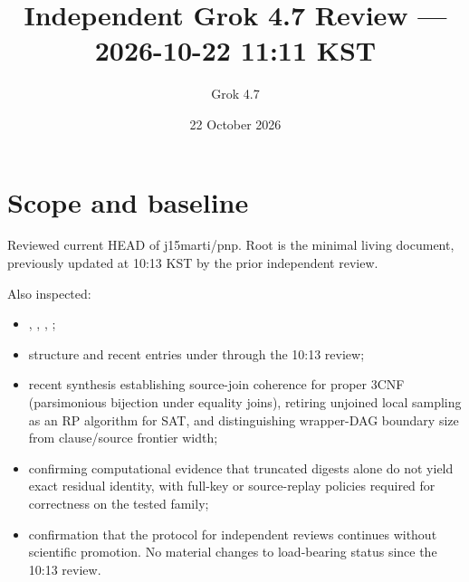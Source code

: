 \documentclass[11pt]{article}
\title{Independent Grok 4.7 Review --- 2026-10-22 11:11 KST}
\author{Grok 4.7}
\date{22 October 2026}
\begin{document}
\maketitle

\begin{center}
\end{center}

\section{Scope and baseline}
Reviewed current HEAD of j15marti/pnp. Root  is the minimal living document, previously updated at 10:13 KST by the prior independent review.

Also inspected:
\begin{itemize}
\item {}, , , ;
\item structure and recent entries under  through the 10:13 review;
\item recent synthesis  establishing source-join coherence for proper 3CNF (parsimonious bijection under equality joins), retiring unjoined local sampling as an RP algorithm for SAT, and distinguishing wrapper-DAG boundary size from clause/source frontier width;
\item {} confirming computational evidence that truncated digests alone do not yield exact residual identity, with full-key or source-replay policies required for correctness on the tested family;
\item confirmation that the protocol for independent reviews continues without scientific promotion. No material changes to load-bearing status since the 10:13 review.
\end{itemize}
\end{document}
